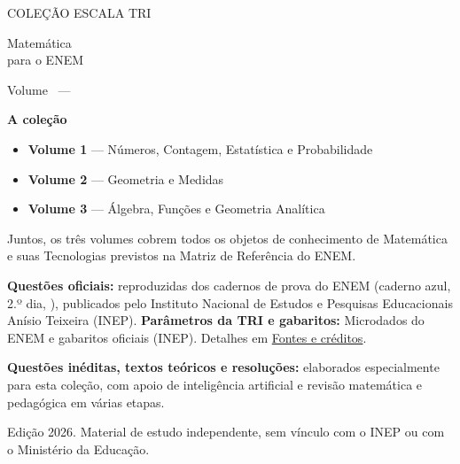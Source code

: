 \thispagestyle{vazio}
\vspace*{8mm}
{\titlefontsemi\small\color{ebookPrim}COLEÇÃO ESCALA TRI}\par\vspace{4mm}
{\titlefontblack\fontsize{34}{36}\selectfont\color{ebookDark}Matemática\\para o ENEM}\par\vspace{5mm}
{\titlefont\Large\color{ebookPrim}Volume \numvolume\ — \titulovolume}\par\vspace{10mm}

\begin{tcolorbox}[enhanced,colback=ebookSoft,colframe=ebookLight,arc=6pt,boxrule=.6pt,left=10pt,right=10pt,top=8pt,bottom=8pt]
\small
\textbf{A coleção}\par
\begin{itemize}[leftmargin=1.3em,itemsep=1pt,topsep=3pt]
  \item \textbf{Volume 1} — Números, Contagem, Estatística e Probabilidade
  \item \textbf{Volume 2} — Geometria e Medidas
  \item \textbf{Volume 3} — Álgebra, Funções e Geometria Analítica
\end{itemize}
Juntos, os três volumes cobrem todos os objetos de conhecimento de Matemática e suas Tecnologias
previstos na Matriz de Referência do ENEM.
\end{tcolorbox}

\vfill
{\footnotesize\color{ebookMuted}
\textbf{Questões oficiais:} reproduzidas dos cadernos de prova do ENEM (caderno azul, 2.º dia, \anosbanco),
publicados pelo Instituto Nacional de Estudos e Pesquisas Educacionais Anísio Teixeira (INEP).
\textbf{Parâmetros da TRI e gabaritos:} Microdados do ENEM e gabaritos oficiais (INEP).
Detalhes em \hyperlink{creditos}{Fontes e créditos}.\par\medskip
\textbf{Questões inéditas, textos teóricos e resoluções:} elaborados especialmente para esta coleção,
com apoio de inteligência artificial e revisão matemática e pedagógica em várias etapas.\par\medskip
Edição 2026. Material de estudo independente, sem vínculo com o INEP ou com o Ministério da Educação.\par}
\clearpage
